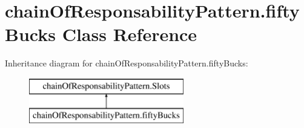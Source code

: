 \hypertarget{classchain_of_responsability_pattern_1_1fifty_bucks}{}\section{chain\+Of\+Responsability\+Pattern.\+fifty\+Bucks Class Reference}
\label{classchain_of_responsability_pattern_1_1fifty_bucks}
Inheritance diagram for chain\+Of\+Responsability\+Pattern.\+fifty\+Bucks\+:\begin{figure}[H]
\begin{center}
\leavevmode
\includegraphics[height=2.000000cm]{classchain_of_responsability_pattern_1_1fifty_bucks}
\end{center}
\end{figure}
